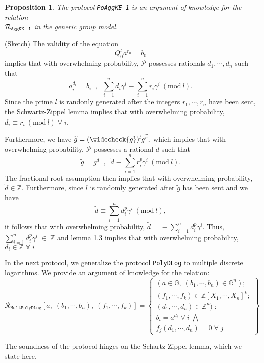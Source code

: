 \documentclass[11pt, lettersize, notitlepage, leqno, footskip=0.6cm]{article}
\newcommand{\bz}{\mathbb Z}
\newcommand{\slim}{\sum\limits}
\newcommand{\ttt}{\texttt}
\newcommand{\wti}{\widetilde}
\newcommand{\mc}{\mathcal}
\newcommand{\mb}{\mathbb}
\newcommand{\weck}{\widecheck}
\newcommand{\mP}{\mc{P}}
\newcommand{\vs}{\vspace{-0.15cm}}
\newcommand{\noin}{\noindent}
\newcommand{\op}{overwhelming probability}
\newcommand{\Mod}[1]{\ (\mathrm{mod}\ #1)}
\newtheorem{Prop}[Thm]{Proposition}
\numberwithin{equation}{section}
\begin{document}
\vspace{0.2cm}

\begin{Prop} The protocol \verb|PoAggKE-1| is an argument of knowledge for the relation\\ $\mc{R}_{{\tt{AggKE-1}}}$ in the generic group model.\end{Prop}

\begin{prf} (Sketch) The validity of the equation \vs $$Q_0^la^{r_0} = b_0$$ implies that with \op, 
$\mP$ possesses rationals $d_1,\cdots,d_n$ such that \vs $$a_i^{d_i} = b_i \;\;,\;\;\slim_{i=1}^{n} d_i\gamma^i \equiv \slim_{i=1}^{n} r_i\gamma^i\Mod{l}.$$ Since the prime $l$ is randonly generated after the integers $r_1,\cdots,r_n$ have been sent, the Schwartz-Zippel lemma implies that with \op, $d_i\equiv r_i\Mod{l}\;\forall\;i$. 

Furthermore, we have $\wti{g} = (\weck{g})^lg^{\wti{r}},$ which implies that with \op, $\mP$ possesses a rational $\wti{d}$ such that \vs $$\wti{g} = g^{\wti{d}}\;\;,\;\;\wti{d}\equiv \slim_{i=1}^n r_i^p\gamma^i\Mod{l} .$$ The fractional root assumption then implies that with \op, $\wti{d}\in \bz$. Furthermore, since $l$ is randomly generated after $\wti{g}$ has been sent and we have \vs $$\wti{d}\equiv \slim_{i=1}^nd_i^p\gamma^i\Mod{l},$$ it follows that with \op, $\wti{d} = \equiv \slim_{i=1}^n d_i^p\gamma^i$. Thus, $\slim_{i=1}^n d_i^p \gamma^i\;\in\;\bz$ and lemma 1.3 implies that with \op, $d_i\in\bz\;\forall\;i$\end{prf}

\bigskip

In the next protocol, we generalize the protocol \verb|PolyDLog| to multiple discrete logarithms. We provide an argument of knowledge for the relation: 
\[
  \mc{R}_{\ttt{MultPolyDLog}}[a,\; (b_1,\cdots, b_n),\; (f_1,\cdots,f_k)] = \left\{\begin{array}{l}
    (a\in\mb{G},\; (b_1,\cdots, b_n)\in\mb{G}^n);\\
    (f_1,\cdots,f_k)\in\bz[X_1,\cdots,X_n]^k;\\ 
    (d_1,\cdots,d_n)\in\bz^n)\;: \\
    b_i = a^{d_i}\;\forall\; i\;\bigwedge \;\\   f_j(d_1,\cdots,d_n) = 0\;\forall\; j 
  \end{array}\right\}
\] 

\noin The soundness of the protocol hinges on the Schartz-Zippel lemma, which we state here.
\end{document}
